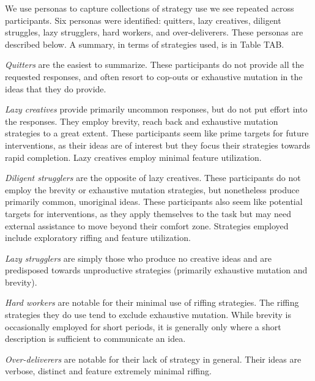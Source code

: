 We use personas to capture collections of strategy use we see repeated across participants. 
Six personas were identified: quitters, lazy creatives, diligent struggles, lazy strugglers, hard workers, and over-deliverers. These personas are described below. A summary, in terms of strategies used, is in Table TAB.

\emph{Quitters} are the easiest to summarize. These participants do not provide all the requested responses, and often resort to cop-outs or exhaustive mutation in the ideas that they do provide.

\emph{Lazy creatives} provide primarily uncommon responses, but do not put effort into the responses. They employ brevity, reach back and exhaustive mutation strategies to a great extent. These participants seem like prime targets for future interventions, as their ideas are of interest but they focus their strategies towards rapid completion. Lazy creatives employ minimal feature utilization.

\emph{Diligent strugglers} are the opposite of lazy creatives. These participants do not employ the brevity or exhaustive mutation strategies, but nonetheless produce primarily common, unoriginal ideas. These participants also seem like potential targets for interventions, as they apply themselves to the task but may need external assistance to move beyond their comfort zone. Strategies employed include exploratory riffing and feature utilization.

\emph{Lazy strugglers} are simply those who produce no creative ideas and are predisposed towards unproductive strategies (primarily exhaustive mutation and brevity).

\emph{Hard workers} are notable for their minimal use of riffing strategies. The riffing strategies they do use tend to exclude exhaustive mutation. While brevity is occasionally employed for short periods, it is generally only where a short description is sufficient to communicate an idea.

\emph{Over-deliverers} are notable for their lack of strategy in general. Their ideas are verbose, distinct and feature extremely minimal riffing. 

